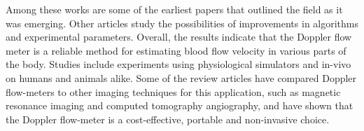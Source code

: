Among these works are some of the earliest papers that outlined the field as it was emerging. Other articles study the possibilities of improvements in algorithms and experimental parameters. Overall, the results indicate that the Doppler flow meter is a reliable method for estimating blood flow velocity in various parts of the body. Studies include experiments using physiological simulators and in-vivo on humans and animals alike. Some of the review articles have compared Doppler flow-meters to other imaging techniques for this application, such as magnetic resonance imaging and computed tomography angiography, and have shown that the Doppler flow-meter is a cost-effective, portable and non-invasive choice.
%


